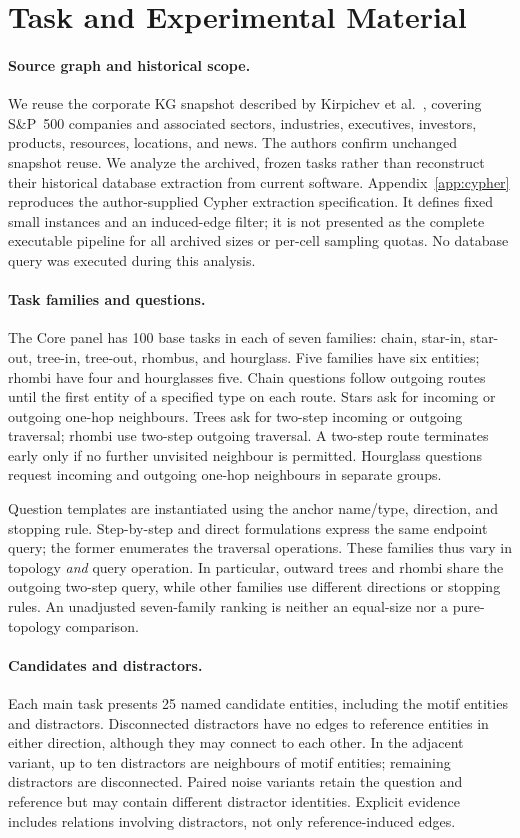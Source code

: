 \section{Task and Experimental Material}
\label{sec:method}
\paragraph{Source graph and historical scope.}
We reuse the corporate KG snapshot described by Kirpichev et al.~\cite{kirpichev2026towards}, covering S\&P~500 companies and associated sectors, industries, executives, investors, products, resources, locations, and news. The authors confirm unchanged snapshot reuse. We analyze the archived, frozen tasks rather than reconstruct their historical database extraction from current software. Appendix~\ref{app:cypher} reproduces the author-supplied Cypher extraction specification. It defines fixed small instances and an induced-edge filter; it is not presented as the complete executable pipeline for all archived sizes or per-cell sampling quotas. No database query was executed during this analysis.

\paragraph{Task families and questions.}
The Core panel has 100 base tasks in each of seven families: chain, star-in, star-out, tree-in, tree-out, rhombus, and hourglass. Five families have six entities; rhombi have four and hourglasses five. Chain questions follow outgoing routes until the first entity of a specified type on each route. Stars ask for incoming or outgoing one-hop neighbours. Trees ask for two-step incoming or outgoing traversal; rhombi use two-step outgoing traversal. A two-step route terminates early only if no further unvisited neighbour is permitted. Hourglass questions request incoming and outgoing one-hop neighbours in separate groups.

Question templates are instantiated using the anchor name/type, direction, and stopping rule. Step-by-step and direct formulations express the same endpoint query; the former enumerates the traversal operations. These families thus vary in topology \emph{and} query operation. In particular, outward trees and rhombi share the outgoing two-step query, while other families use different directions or stopping rules. An unadjusted seven-family ranking is neither an equal-size nor a pure-topology comparison.

\paragraph{Candidates and distractors.}
Each main task presents 25 named candidate entities, including the motif entities and distractors. Disconnected distractors have no edges to reference entities in either direction, although they may connect to each other. In the adjacent variant, up to ten distractors are neighbours of motif entities; remaining distractors are disconnected. Paired noise variants retain the question and reference but may contain different distractor identities. Explicit evidence includes relations involving distractors, not only reference-induced edges.

